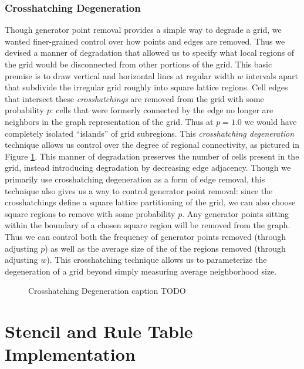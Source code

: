 \documentclass[a4paper,11pt]{report}
\begin{document}
\subsubsection{Crosshatching Degeneration}
Though generator point removal provides a simple way to degrade a grid, we wanted finer-grained control over how points and edges are removed. Thus we devised a manner of degradation that allowed us to specify what local regions of the grid would be disconnected from other portions of the grid. This basic premise is to draw vertical and horizontal lines at regular width $w$ intervals apart that subdivide the irregular grid roughly into square lattice regions. Cell edges that intersect these \textit{crosshatchings} are removed from the grid with some probability $p$: cells that were formerly connected by the edge no longer are neighbors in the graph representation of the grid. Thus at $p=1.0$ we would have completely isolated ``islands'' of grid subregions. This \textit{crosshatching degeneration} technique allows us control over the degree of regional connectivity, as pictured in Figure \ref{fig:crosshatch_degen}. This manner of degradation preserves the number of cells present in the grid, instead introducing degradation by decreasing edge adjacency. Though we primarily use crosshatching degeneration as a form of edge removal, this technique also gives us a way to control generator point removal: since the crosshatchings define a square lattice partitioning of the grid, we can also choose square regions to remove with some probability $p$. Any generator points sitting within the boundary of a chosen square region will be removed from the graph. Thus we can control both the frequency of generator points removed (through adjusting $p$) as well as the average size of the of the regions removed (through adjusting $w$). This crosshatching technique allows us to parameterize the degeneration of a grid beyond simply measuring average neighborhood size.

\begin{figure}
\centering
\caption[Crosshatching Degeneration]{
	Crosshatching Degeneration caption TODO
}
\label{fig:crosshatch_degen}
\end{figure}

\section{Stencil and Rule Table Implementation}
\label{sec:StencilGen}
\end{document}
